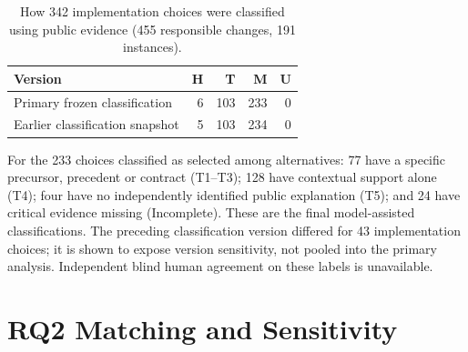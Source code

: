 \begin{table}[H]
\caption{How 342 implementation choices were classified using public evidence (455 responsible changes, 191 instances).}
\label{tab:routes}
\small
\begin{tabular}{@{}lrrrr@{}}
\toprule
\textbf{Version} & \textbf{H} & \textbf{T} & \textbf{M} & \textbf{U}\\
\midrule
Primary frozen classification & 6 & 103 & 233 & 0\\
Earlier classification snapshot & 5 & 103 & 234 & 0\\
\bottomrule
\end{tabular}
\par\smallskip\raggedright\footnotesize For the 233 choices classified as selected among alternatives: 77 have a specific precursor, precedent or contract (T1--T3); 128 have contextual support alone (T4); four have no independently identified public explanation (T5); and 24 have critical evidence missing (Incomplete). These are the final model-assisted classifications. The preceding classification version differed for 43 implementation choices; it is shown to expose version sensitivity, not pooled into the primary analysis. Independent blind human agreement on these labels is unavailable.
\end{table}


\FloatBarrier
\section{RQ2 Matching and Sensitivity}\label{sec:s5}

